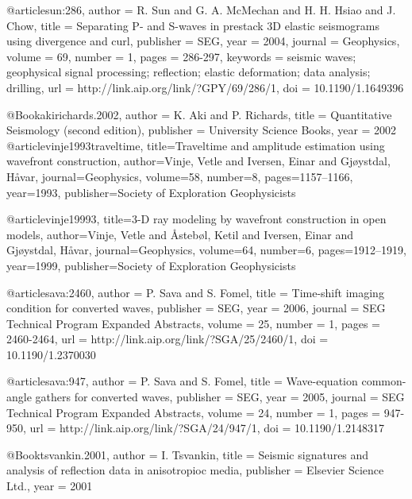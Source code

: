 {@article{sun:286,
  author =	 {R. Sun and G. A. McMechan and H. H. Hsiao
                  and J. Chow},
  title =	 {Separating {P}- and {S}-waves in prestack {3D}
                  elastic seismograms using divergence and curl},
  publisher =	 {SEG},
  year =	 2004,
  journal =	 {Geophysics},
  volume =	 69,
  number =	 1,
  pages =	 {286-297},
  keywords =	 {seismic waves; geophysical signal processing;
                  reflection; elastic deformation; data analysis;
                  drilling},
  url =		 {http://link.aip.org/link/?GPY/69/286/1},
  doi =		 {10.1190/1.1649396}
}

@Book{akirichards.2002,
  author =	 {K. Aki and P. Richards},
  title =	 {Quantitative Seismology (second edition)},
  publisher =	 {University Science Books},
  year =	 2002
}
@article{vinje1993traveltime,
  title={Traveltime and amplitude estimation using wavefront construction},
  author={Vinje, Vetle and Iversen, Einar and Gj{\o}ystdal, H{\aa}var},
  journal={Geophysics},
  volume={58},
  number={8},
  pages={1157--1166},
  year={1993},
  publisher={Society of Exploration Geophysicists}
}

@article{vinje19993,
  title={3-D ray modeling by wavefront construction in open models},
  author={Vinje, Vetle and {\AA}steb{\o}l, Ketil and Iversen, Einar and Gj{\o}ystdal, H{\aa}var},
  journal={Geophysics},
  volume={64},
  number={6},
  pages={1912--1919},
  year={1999},
  publisher={Society of Exploration Geophysicists}
}



@article{sava:2460,
  author =	 {P. Sava and S. Fomel},
  title =	 {Time-shift imaging condition for converted waves},
  publisher =	 {SEG},
  year =	 2006,
  journal =	 {SEG Technical Program Expanded Abstracts},
  volume =	 25,
  number =	 1,
  pages =	 {2460-2464},
  url =		 {http://link.aip.org/link/?SGA/25/2460/1},
  doi =		 {10.1190/1.2370030}
}

@article{sava:947,
  author =	 {P. Sava and S. Fomel},
  title =	 {Wave-equation common-angle gathers for converted
                  waves},
  publisher =	 {SEG},
  year =	 2005,
  journal =	 {SEG Technical Program Expanded Abstracts},
  volume =	 24,
  number =	 1,
  pages =	 {947-950},
  url =		 {http://link.aip.org/link/?SGA/24/947/1},
  doi =		 {10.1190/1.2148317}
}

@Book{tsvankin.2001,
  author =	 {I. Tsvankin},
  title =	 {Seismic signatures and analysis of reflection data
                  in anisotropioc media},
  publisher =	 {Elsevier Science Ltd.},
  year =	 2001
}

}
